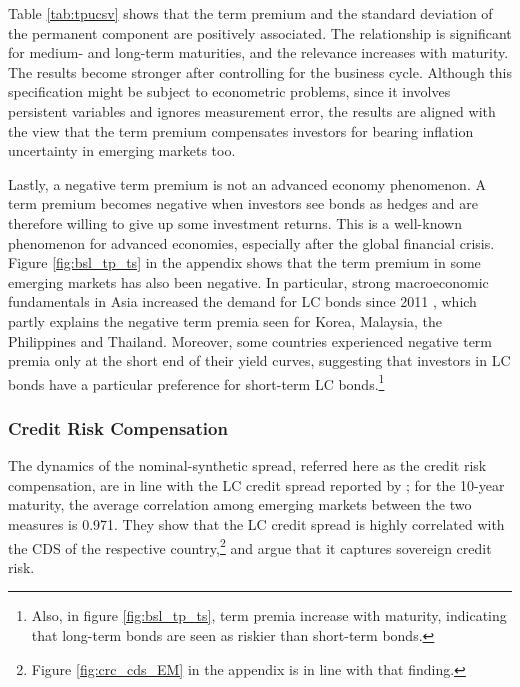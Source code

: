 {Table \ref{tab:tpucsv} shows that the term premium and the standard deviation of the permanent component are positively associated. The relationship is significant for medium- and long-term maturities, 
and the relevance increases with maturity.
The results become stronger after controlling for the business cycle. 
Although this specification might be subject to econometric problems, since it involves persistent variables and ignores measurement error, the results are aligned with the view that the term premium compensates investors for bearing inflation uncertainty in emerging markets too.



Lastly, a negative term premium is not an advanced economy phenomenon. 
A term premium becomes negative when investors see bonds as hedges and are therefore willing to give up some investment returns. 
This is a well-known phenomenon for advanced economies, especially after the global financial crisis. 
Figure \ref{fig:bsl_tp_ts} in the appendix shows that the term premium in some emerging markets has also been negative. 
In particular, strong macroeconomic fundamentals in Asia increased the demand for LC bonds since 2011 \citep{IMFWB:2020}, which partly explains the negative term premia seen for Korea, Malaysia, the Philippines and Thailand.
Moreover, some countries experienced negative term premia only at the short end of their yield curves, suggesting that investors in LC bonds have a particular preference for short-term LC bonds.\footnote{Also, in figure \ref{fig:bsl_tp_ts}, term premia increase with maturity, indicating that long-term bonds are seen as riskier than short-term bonds.} 


\subsubsection{Credit Risk Compensation} \label{sec:CRC}
\iftoggle{toclinks}{\gototoc}{} %

The dynamics of the nominal-synthetic spread, referred here as the credit risk compensation, are in line with the LC credit spread reported by \cite{DuSchreger:2016JoF}; for the 10-year maturity, the average correlation among emerging markets between the two measures is 0.971. 
They show that the LC credit spread is highly correlated with the CDS of the respective country,\footnote{Figure \ref{fig:crc_cds_EM} in the appendix is in line with that finding.} and argue that it captures sovereign credit risk.

}
